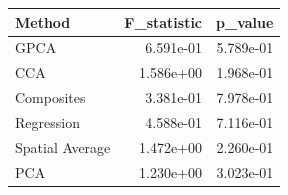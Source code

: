 \begin{tabular}{lrr}
\toprule
Method & F_statistic & p_value \\
\midrule
GPCA & 6.591e-01 & 5.789e-01 \\
CCA & 1.586e+00 & 1.968e-01 \\
Composites & 3.381e-01 & 7.978e-01 \\
Regression & 4.588e-01 & 7.116e-01 \\
Spatial Average & 1.472e+00 & 2.260e-01 \\
PCA & 1.230e+00 & 3.023e-01 \\
\bottomrule
\end{tabular}
